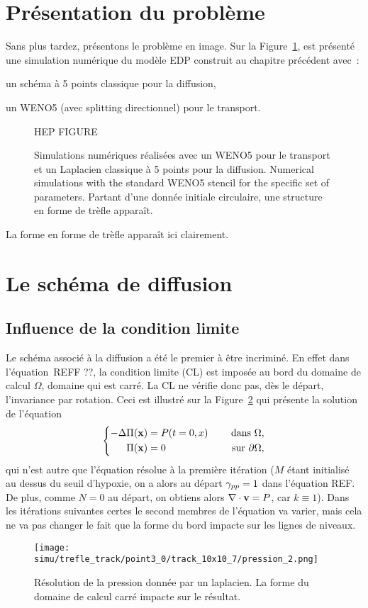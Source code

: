 \documentclass[main.tex]{subfiles}
\begin{document}
\section{Présentation du problème}
Sans plus tardez, présentons le problème en image. Sur la Figure~\ref{fig:trefle}, est présenté une simulation numérique du modèle EDP construit au chapitre précédent avec~:
\begin{myitemize}
\item un schéma à 5 points classique pour la diffusion,
\item un WENO5 (avec splitting directionnel) pour le transport.
\end{myitemize}
\begin{figure}
\centering
HEP FIGURE
\caption{\label{fig:trefle} Simulations numériques réalisées avec un WENO5 pour le transport et un Laplacien classique à 5 points pour la diffusion. Numerical simulations with the standard WENO5 stencil for the
specific set of parameters. Partant d'une donnée initiale circulaire, 
une structure en forme de trèfle apparaît.}
\end{figure}
La forme en forme de trèfle apparaît ici clairement. 

\section{Le schéma de diffusion}
\subsection{Influence de la condition limite}
Le schéma associé à la diffusion a été le premier à être incriminé. En effet dans l'équation~REFF ??, la condition limite (CL) est imposée au bord du domaine de calcul $\Omega$, domaine qui est carré. La CL ne vérifie donc pas, dès le départ, l'invariance par rotation. Ceci est illustré sur la Figure~\ref{fig:ligne_nvx_laplace_carre} qui présente la solution de l'équation
\begin{equation}\label{eq:pression_iter1}
\left\{
\begin{aligned}
-\Delta \Pi(\mathbf{x}) &= P(t=0,x) & \quad \textrm{ dans }  \Omega , \\
\Pi(\mathbf{x}) &=0 & \quad \textrm{ sur  } \partial \Omega,
\end{aligned}
\right.
\end{equation}
qui n'est autre que l'équation résolue à la première itération ($M$ étant initialisé au dessus du seuil d'hypoxie, on a alors au départ $\gamma_{pp}=1$ dans l'équation REF. De plus, comme $N=0$ au départ, on obtiens alors $\nabla\cdot \mathbf{v} = P$, car $k\equiv1$). Dans les itérations suivantes certes le second membres de l'équation va varier, mais cela ne va pas changer le fait que la forme du bord impacte sur les lignes de niveaux.
\begin{figure}
\centering
\texttt{[image: simu/trefle\_track/point3\_0/track\_10x10\_7/pression\_2.png]}
\vspace{-4mm}\\
\caption{\label{fig:ligne_nvx_laplace_carre} Résolution de la pression donnée par un laplacien. La forme du domaine de calcul carré impacte sur le résultat.}
\end{figure}
\end{document}
